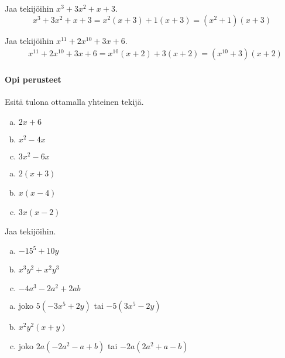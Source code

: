 \begin{esimerkki}
Jaa tekijöihin $x^3+3x^2+x+3$.
\begin{equation*}
x^3+3x^2+x+3=x^2(x+3)+1(x+3)=(x^2+1)(x+3)
\end{equation*}
\end{esimerkki}

\begin{esimerkki}
Jaa tekijöihin $x^{11}+2x^{10}+3x+6$.
\begin{align*}
& x^{11}+2x^{10}+3x+6=x^{10}(x+2)+3(x+2)=(x^{10}+3)(x+2)
\end{align*}
\end{esimerkki}

\Harjoitustehtavat

\paragraph*{Opi perusteet}

\begin{tehtava}
    Esitä tulona ottamalla yhteinen tekijä.
    \begin{enumerate}[a)]
        \item $2x+6$
        \item $x^2 -4x$
        \item $3x^2 - 6x$
    \end{enumerate}
    \begin{vastaus}
        \begin{enumerate}[a)]
        \item $2(x+3)$
        \item $x(x-4)$
        \item $3x(x-2)$
        \end{enumerate}
    \end{vastaus}
\end{tehtava}

\begin{tehtava}
    Jaa tekijöihin.
    \begin{enumerate}[a)]
        \item $-15^5 +10y$
        \item $x^3y^2 +x^2y^3$
        \item $-4a^3 -2a^2 +2ab$
    \end{enumerate}
    \begin{vastaus}
        \begin{enumerate}[a)]
        \item joko $5(-3x^5 +2y)$ tai $-5(3x^5 -2y)$
        \item $x^2y^2(x+y)$
        \item joko $2a(-2a^2 -a +b)$ tai $-2a(2a^2 +a -b)$
        \end{enumerate}
    \end{vastaus}
\end{tehtava}


